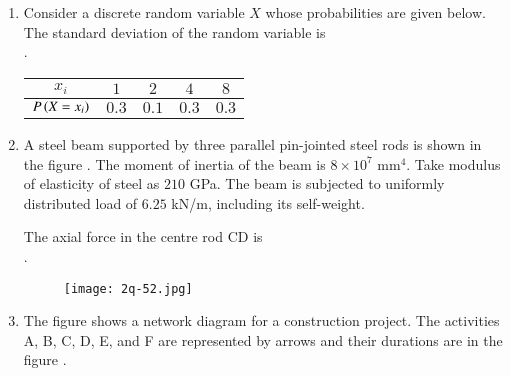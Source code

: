 \documentclass[journal,12pt,onecolumn]{article}
\theoremstyle{remark}
\begin{document}
\begin{enumerate}
    \hfill{}
    \begin{enumerate}
    \end{enumerate}

    \item Consider a discrete random variable $X$ whose probabilities are given below. The standard deviation of the random variable is \underline{\hspace{2cm}} \\ .
    \begin{center}
    \begin{tabular}{|c|c|c|c|c|}
        \hline
        $x_i$ & $1$ & $2$ & $4$ & $8$ \\
        \hline
        $P\left(X=x_i\right)$ & $0.3$ & $0.1$ & $0.3$ & $0.3$ \\
        \hline
    \end{tabular}
    \end{center}
    
    \hfill{}

    \item A steel beam supported by three parallel pin-jointed steel rods is shown in the figure . The moment of inertia of the beam is $8 \times 10^7$ mm$^4$. Take modulus of elasticity of steel as $210$ GPa. The beam is subjected to uniformly distributed load of $6.25$ kN/m, including its self-weight.
    
    The axial force  in the centre rod CD is \underline{\hspace{2cm}} \\ .
    \begin{figure}[H]
        \centering
        \texttt{[image: 2q-52.jpg]}
        \caption{}
        \label{fig:q52}
    \end{figure}
    
    \hfill{}

    \item The figure shows a network diagram for a construction project. The activities A, B, C, D, E, and F are represented by arrows and their durations are in the figure .
    

\end{enumerate}
\end{document}
